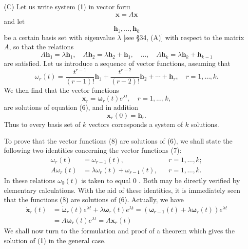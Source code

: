 \documentclass[10pt,a5paper]{book}
\theoremstyle{plain}
\theoremstyle{definition}
\theoremstyle{remark}
\begin{document}
(C) Let us write system (1) in vector form
\begin{equation*}
\dot{\mathbf{x}}=A \mathbf{x} \tag{6}
\end{equation*}
and let
\[
\mathbf{h}_{1}, \ldots, \mathbf{h}_{k}
\]
be a certain basis set with eigenvalue $\lambda$ [see §34, (A)] with respect to the matrix $A$, so that the relations
\[
A \mathbf{h}_{1}=\lambda \mathbf{h}_{1}, \quad A \mathbf{h}_{2}=\lambda \mathbf{h}_{2}+\mathbf{h}_{1}, \quad \ldots, \quad A \mathbf{h}_{k}=\lambda \mathbf{h}_{k}+\mathbf{h}_{k-1}
\]
are satisfied. Let us introduce a sequence of vector functions, assuming that
\begin{equation*}
\omega_{r}(t)=\frac{t^{r-1}}{(r-1)!} \mathbf{h}_{1}+\frac{t^{r-2}}{(r-2)!} \mathbf{h}_{2}+\cdots+\mathbf{h}_{r}, \quad r=1, \ldots, k . \tag{7}
\end{equation*}
We then find that the vector functions
\begin{equation*}
\mathbf{x}_{r}=\boldsymbol{\omega}_{r}(t) e^{\lambda t}, \quad r=1, \ldots, k, \tag{8}
\end{equation*}
are solutions of equation (6), and in addition
\begin{equation*}
\mathbf{x}_{r}(0)=\mathbf{h}_{r} . \tag{9}
\end{equation*}
Thus to every basis set of $k$ vectors corresponds a system of $k$ solutions.

To prove that the vector functions (8) are solutions of (6), we shall state the following two identities concerning the vector functions (7):
\[
\begin{aligned}
\dot{\omega}_{r}(t) & =\omega_{r-1}(t), & & r=1, \ldots, k ; \\
A \omega_{r}(t) & =\lambda \omega_{r}(t)+\omega_{r-1}(t), & & r=1, \ldots, k .
\end{aligned}
\]
In these relations $\omega_{0}(t)$ is taken to equal 0 . Both may be directly verified by elementary calculations. With the aid of these identities, it is immediately seen that the functions (8) are solutions of (6). Actually, we have
\[
\begin{aligned}
\dot{\mathbf{x}}_{r}(t) & =\dot{\boldsymbol{\omega}}_{r}(t) e^{\lambda t}+\lambda \boldsymbol{\omega}_{\tau}(t) e^{\lambda t}=\left(\boldsymbol{\omega}_{r-1}(t)+\lambda \boldsymbol{\omega}_{\tau}(t)\right) e^{\lambda t} \\
& =A \boldsymbol{\omega}_{r}(t) e^{\lambda t}=A \mathbf{x}_{r}(t)
\end{aligned}
\]
We shall now turn to the formulation and proof of a theorem which gives the solution of (1) in the general case.
\end{document}
